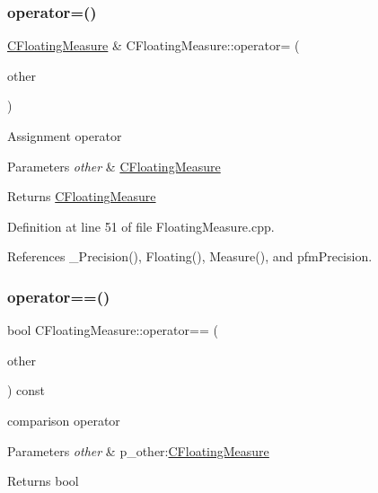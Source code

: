 \subsubsection{\texorpdfstring{operator=()}{operator=()}}
{\footnotesize\ttfamily \hyperlink{classCFloatingMeasure}{C\+Floating\+Measure} \& C\+Floating\+Measure\+::operator= (\begin{DoxyParamCaption}\item[{const \hyperlink{classCFloatingMeasure}{C\+Floating\+Measure} \&}]{other }\end{DoxyParamCaption})}

Assignment operator


\begin{DoxyParams}{Parameters}
{\em other} & \hyperlink{classCFloatingMeasure}{C\+Floating\+Measure} \\
\hline
\end{DoxyParams}
\begin{DoxyReturn}{Returns}
\hyperlink{classCFloatingMeasure}{C\+Floating\+Measure} 
\end{DoxyReturn}


Definition at line 51 of file Floating\+Measure.\+cpp.



References \+\_\+\+Precision(), Floating(), Measure(), and pfm\+Precision.

\mbox{\label{classCFloatingMeasure_ab4233b1232751f99e9e1f91f2ee55cc9}} 
\subsubsection{\texorpdfstring{operator==()}{operator==()}}
{\footnotesize\ttfamily bool C\+Floating\+Measure\+::operator== (\begin{DoxyParamCaption}\item[{const \hyperlink{classCFloatingMeasure}{C\+Floating\+Measure} \&}]{other }\end{DoxyParamCaption}) const}



comparison operator 


\begin{DoxyParams}{Parameters}
{\em other} & p\+\_\+other\+:\hyperlink{classCFloatingMeasure}{C\+Floating\+Measure} \\
\hline
\end{DoxyParams}
\begin{DoxyReturn}{Returns}
bool 
\end{DoxyReturn}


